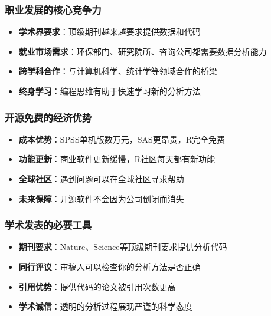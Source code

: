 \documentclass[
]{book}
\providecommand{\tightlist}{%
  \setlength{\itemsep}{0pt}\setlength{\parskip}{0pt}}
\begin{document}
\hypertarget{ux804cux4e1aux53d1ux5c55ux7684ux6838ux5fc3ux7adeux4e89ux529b}{%
\subsubsection{职业发展的核心竞争力}\label{ux804cux4e1aux53d1ux5c55ux7684ux6838ux5fc3ux7adeux4e89ux529b}}

\begin{itemize}
\tightlist
\item
  \textbf{学术界要求}：顶级期刊越来越要求提供数据和代码
\item
  \textbf{就业市场需求}：环保部门、研究院所、咨询公司都需要数据分析能力
\item
  \textbf{跨学科合作}：与计算机科学、统计学等领域合作的桥梁
\item
  \textbf{终身学习}：编程思维有助于快速学习新的分析方法
\end{itemize}

\hypertarget{ux5f00ux6e90ux514dux8d39ux7684ux7ecfux6d4eux4f18ux52bf}{%
\subsubsection{开源免费的经济优势}\label{ux5f00ux6e90ux514dux8d39ux7684ux7ecfux6d4eux4f18ux52bf}}

\begin{itemize}
\tightlist
\item
  \textbf{成本优势}：SPSS单机版数万元，SAS更昂贵，R完全免费
\item
  \textbf{功能更新}：商业软件更新缓慢，R社区每天都有新功能
\item
  \textbf{全球社区}：遇到问题可以在全球社区寻求帮助
\item
  \textbf{未来保障}：开源软件不会因为公司倒闭而消失
\end{itemize}

\hypertarget{ux5b66ux672fux53d1ux8868ux7684ux5fc5ux8981ux5de5ux5177}{%
\subsubsection{学术发表的必要工具}\label{ux5b66ux672fux53d1ux8868ux7684ux5fc5ux8981ux5de5ux5177}}

\begin{itemize}
\tightlist
\item
  \textbf{期刊要求}：Nature、Science等顶级期刊要求提供分析代码
\item
  \textbf{同行评议}：审稿人可以检查你的分析方法是否正确
\item
  \textbf{引用优势}：提供代码的论文被引用次数更高
\item
  \textbf{学术诚信}：透明的分析过程展现严谨的科学态度
\end{itemize}
\end{document}
